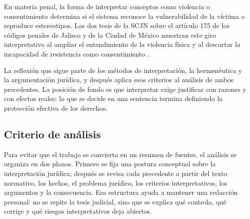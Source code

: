 \documentclass[
	spanish,
	letterpaper, oneside
]{article}
\begin{document}
En materia penal, la forma de interpretar conceptos como violencia o consentimiento determina si el sistema reconoce la vulnerabilidad de la víctima o reproduce estereotipos. Las dos tesis de la SCJN sobre el artículo 175 de los códigos penales de Jalisco y de la Ciudad de México muestran este giro interpretativo al ampliar el entendimiento de la violencia física y al descartar la incapacidad de resistencia como consentimiento \citep{scjnViolenciaFisica2022,scjnIncapacidadResistencia2019}.

La reflexión que sigue parte de los métodos de interpretación, la hermenéutica y la argumentación jurídica, y después aplica esos criterios al análisis de ambos precedentes. La posición de fondo es que interpretar exige justificar con razones y con efectos reales: lo que se decide en una sentencia termina definiendo la protección efectiva de los derechos.

\subsection*{Criterio de análisis}

Para evitar que el trabajo se convierta en un resumen de fuentes, el análisis se organiza en dos planos. Primero se fija una postura conceptual sobre la interpretación jurídica; después se revisa cada precedente a partir del texto normativo, los hechos, el problema jurídico, los criterios interpretativos, los argumentos y la consecuencia. Esa estructura ayuda a mantener una redacción personal: no se repite la tesis judicial, sino que se explica qué controla, qué corrige y qué riesgos interpretativos deja abiertos.

%
%
\end{document}
